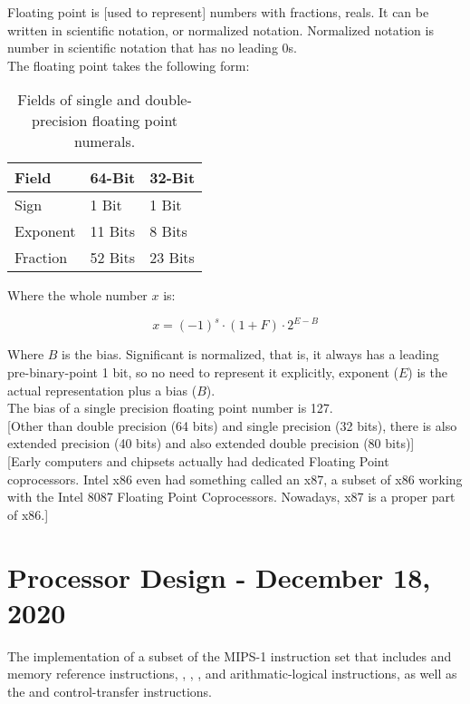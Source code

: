 \documentclass[11pt,a4paper,twocolumn]{book}
\begin{document}
Floating point is [used to represent] numbers with fractions, reals. It can be written in scientific notation, or normalized notation. Normalized notation is number in scientific notation that has no leading 0s.\\

The floating point takes the following form:

\begin{table}
\begin{tabular}{lll}
Field & 64-Bit & 32-Bit\\
\toprule
Sign & 1 Bit & 1 Bit\\
Exponent & 11 Bits & 8 Bits\\
Fraction & 52 Bits & 23 Bits\\
\bottomrule
\end{tabular}
\caption{Fields of single and double-precision floating point numerals.}
\end{table}


Where the whole number $x$ is:

\begin{equation}
x = (-1)^s \cdot (1 + F) \cdot 2^{E - B}
\end{equation}

Where $B$ is the bias. Significant is normalized, that is, it always has a leading pre-binary-point 1 bit, so no need to represent it explicitly, exponent ($E$) is the actual representation plus a bias ($B$).\\

The bias of a single precision floating point number is 127.\\

[Other than double precision (64 bits) and single precision (32 bits), there is also extended precision (40 bits) and also extended double precision (80 bits)]\\

[Early computers and chipsets actually had dedicated Floating Point coprocessors. Intel x86 even had something called an x87, a subset of x86 working with the Intel 8087 Floating Point Coprocessors. Nowadays, x87 is a proper part of x86.]

\chapter{Processor Design - December 18, 2020}

The implementation of a subset of the MIPS-1 instruction set that includes  and  memory reference instructions, , , ,  and  arithmatic-logical instructions, as well as the  and  control-transfer instructions.
\end{document}
